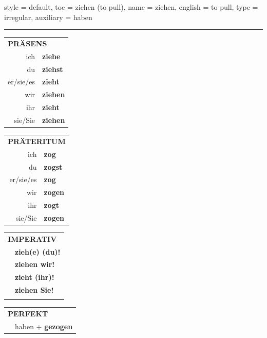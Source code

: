 \begin{verbentry}{
  style = {default},
  toc = {ziehen (to pull)},
  name = {ziehen},
  english = {to pull},
  type = {irregular},
  auxiliary = {haben}
}
 
    
     \vspace{5pt}

    \hrule
    
    \vspace{5pt}

  \begin{tabular}{rl}
     \multicolumn{2}{l}{\textbf{PRÄSENS} }\\
    ich & \textbf{ziehe}\\
    du & \textbf{ziehst}\\
    er/sie/es & \textbf{zieht}\\
    wir & \textbf{ziehen}\\
    ihr & \textbf{zieht}\\
    sie/Sie & \textbf{ziehen}\\
  \end{tabular}
  \hfill
     \begin{tabular}{rl}
    \multicolumn{2}{l}{\textbf{PRÄTERITUM} }\\
    ich & \textbf{zog}\\
    du & \textbf{zogst}\\
    er/sie/es & \textbf{zog}\\
    wir & \textbf{zogen}\\
    ihr & \textbf{zogt}\\
    sie/Sie & \textbf{zogen}\\
  \end{tabular}
  \hfill
  \begin{tabular}{rl}
     \multicolumn{2}{l}{\textbf{IMPERATIV} }\\
   & \textbf{zieh(e) (du)!}\\
   & \textbf{ziehen wir!}\\
   & \textbf{zieht (ihr)!}\\
   & \textbf{ziehen Sie!}\\
   & \vspace{10pt}
  \end{tabular}

    \vspace{10pt}

 \begin{tabular}{rl}
     \multicolumn{2}{l}{\textbf{PERFEKT}}\\
  &  haben + \textbf{gezogen}\\
  \end{tabular}
\hfill
   \begin{tabular}{rl}
   

\end{tabular}
\end{verbentry}
